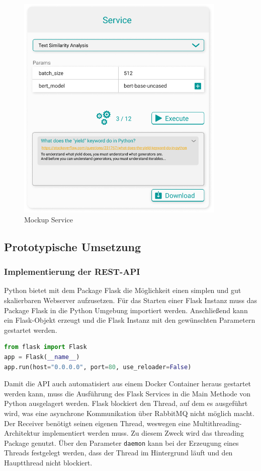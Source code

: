 \begin{figure}[H]
  \centering
    \includegraphics[width = 10cm]{bilder/mockupService}
    \caption{Mockup Service}
\end{figure}

\subsection{Prototypische Umsetzung}
\subsubsection{Implementierung der REST-API}
Python bietet mit dem Package Flask die Möglichkeit einen simplen und gut skalierbaren Webserver aufzusetzen. Für das Starten einer Flask Instanz muss das Package Flask in die Python Umgebung importiert werden. Anschließend kann ein Flask-Objekt erzeugt und die Flask Instanz mit den gewünschten Parametern gestartet werden.

\begin{lstlisting}[language=Python]
from flask import Flask
app = Flask(__name__)
app.run(host="0.0.0.0", port=80, use_reloader=False)
\end{lstlisting}

Damit die API auch automatisiert aus einem Docker Container heraus gestartet werden kann, muss die Ausführung des Flask Services in die Main Methode von Python ausgelagert werden. Flask blockiert den Thread, auf dem es ausgeführt wird, was eine asynchrone Kommunikation über RabbitMQ nicht möglich macht. Der Receiver benötigt seinen eigenen Thread, weswegen eine Multithreading-Architektur implementiert werden muss. Zu diesem Zweck wird das threading Package genutzt. Über den Parameter \texttt{daemon} kann bei der Erzeugung eines Threads festgelegt werden, dass der Thread im Hintergrund läuft und den Hauptthread nicht blockiert.

